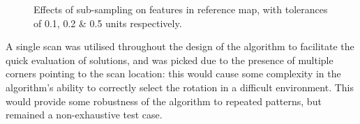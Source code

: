 \documentclass[authoryearcitations]{UoYCSproject}
\begin{document}
\begin{figure}
\begin{subfigure}[b]{0.30\textwidth}
\end{subfigure}
\begin{subfigure}[b]{0.30\textwidth}
\end{subfigure}
\begin{subfigure}[b]{0.30\textwidth}
\end{subfigure}
\caption{Effects of sub-sampling on features in reference map, with tolerances of 0.1, 0.2 \& 0.5 units respectively.}
\label{fig:map_density}
\end{figure}

A single scan was utilised throughout the design of the algorithm to facilitate the quick evaluation of solutions, and was picked due to the presence of multiple corners pointing to the scan location: this would cause some complexity in the algorithm's ability to correctly select the rotation in a difficult environment. This would provide some robustness of the algorithm to repeated patterns, but remained a non-exhaustive test case.
\end{document}
